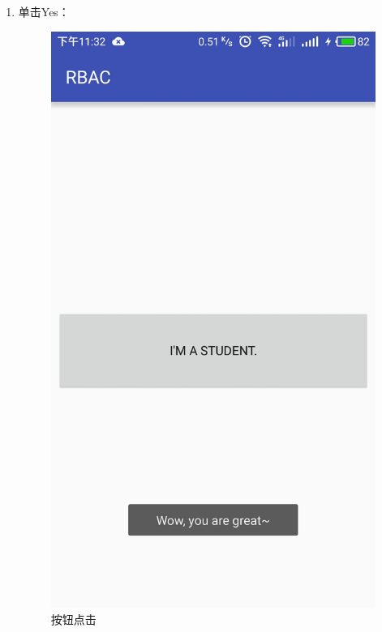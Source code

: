 \begin{itemize}
\begin{enumerate}
\begin{itemize}
\begin{enumerate}
				\item 单击Yes：
				\begin{figure}[H]
					\centering
					\includegraphics[height=0.39\textheight]{snapshot/11}
					\caption{按钮点击}
					\label{fig:11}
				\end{figure}
			

\end{enumerate}
\end{itemize}
\end{enumerate}
\end{itemize}
